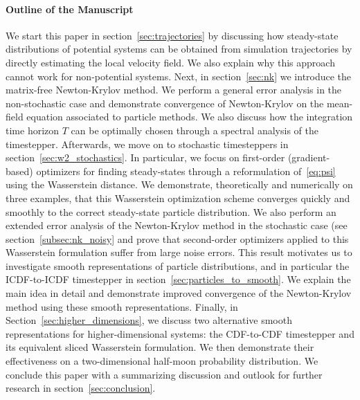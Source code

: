 \documentclass{article}
\begin{document}
\paragraph{Outline of the Manuscript}
We start this paper in section~\ref{sec:trajectories} by discussing how steady-state distributions of potential systems can be obtained from simulation trajectories by directly estimating the local velocity field. We also explain why this approach cannot work for non-potential systems. Next, in section~\ref{sec:nk} we introduce the matrix-free Newton-Krylov method. We perform a general error analysis in the non-stochastic case and demonstrate convergence of Newton-Krylov on the mean-field equation associated to particle methods. We also discuss how the integration time horizon $T$ can be optimally chosen through a spectral analysis of the timestepper. Afterwards, we move on to stochastic timesteppers in section~\ref{sec:w2_stochastics}. In particular, we focus on first-order (gradient-based) optimizers for finding steady-states through a reformulation of~\eqref{eq:psi} using the Wasserstein distance. We demonstrate, theoretically and numerically on three examples, that this Wasserstein optimization scheme converges quickly and smoothly to the correct steady-state particle distribution. We also perform an extended error analysis of the Newton-Krylov method in the stochastic case (see section~\ref{subsec:nk_noisy} and prove that second-order optimizers applied to this Wasserstein formulation suffer from large noise errors. This result motivates us to investigate smooth representations of particle distributions, and in particular the ICDF-to-ICDF timestepper in section~\ref{sec:particles_to_smooth}. We explain the main idea in detail and demonstrate improved convergence of the Newton-Krylov method using these smooth representations. Finally, in Section~\ref{sec:higher_dimensions}, we discuss two alternative smooth representations for higher-dimensional systems: the CDF-to-CDF timestepper and its equivalent sliced Wasserstein formulation. We then demonstrate their effectiveness on a two-dimensional half-moon probability distribution. We conclude this paper with a summarizing discussion and outlook for further research in section~\ref{sec:conclusion}.
\end{document}
